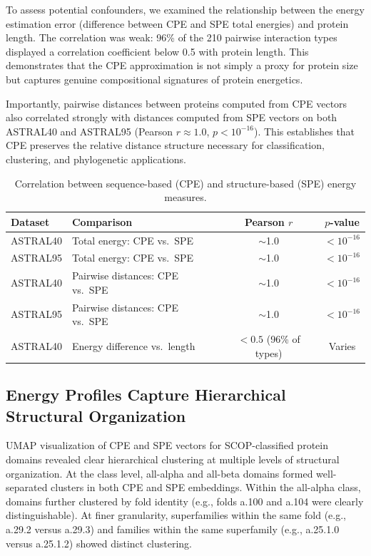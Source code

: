 \documentclass[11pt]{article}
\begin{document}
To assess potential confounders, we examined the relationship between the energy estimation error (difference between CPE and SPE total energies) and protein length. The correlation was weak: 96\% of the 210 pairwise interaction types displayed a correlation coefficient below 0.5 with protein length. This demonstrates that the CPE approximation is not simply a proxy for protein size but captures genuine compositional signatures of protein energetics.

Importantly, pairwise distances between proteins computed from CPE vectors also correlated strongly with distances computed from SPE vectors on both ASTRAL40 and ASTRAL95 (Pearson $r \approx 1.0$, $p < 10^{-16}$). This establishes that CPE preserves the relative distance structure necessary for classification, clustering, and phylogenetic applications.

\begin{table}[htbp]
\centering
\caption{Correlation between sequence-based (CPE) and structure-based (SPE) energy measures.}
\label{tab:correlations}
\begin{tabular}{llcc}
\toprule
\textbf{Dataset} & \textbf{Comparison} & \textbf{Pearson $r$} & \textbf{$p$-value} \\
\midrule
ASTRAL40 & Total energy: CPE vs.\ SPE & $\sim$1.0 & $<10^{-16}$ \\
ASTRAL95 & Total energy: CPE vs.\ SPE & $\sim$1.0 & $<10^{-16}$ \\
ASTRAL40 & Pairwise distances: CPE vs.\ SPE & $\sim$1.0 & $<10^{-16}$ \\
ASTRAL95 & Pairwise distances: CPE vs.\ SPE & $\sim$1.0 & $<10^{-16}$ \\
ASTRAL40 & Energy difference vs.\ length & $<0.5$ (96\% of types) & Varies \\
\bottomrule
\end{tabular}
\end{table}

\subsection{Energy Profiles Capture Hierarchical Structural Organization}

UMAP visualization of CPE and SPE vectors for SCOP-classified protein domains revealed clear hierarchical clustering at multiple levels of structural organization. At the class level, all-alpha and all-beta domains formed well-separated clusters in both CPE and SPE embeddings. Within the all-alpha class, domains further clustered by fold identity (e.g., folds a.100 and a.104 were clearly distinguishable). At finer granularity, superfamilies within the same fold (e.g., a.29.2 versus a.29.3) and families within the same superfamily (e.g., a.25.1.0 versus a.25.1.2) showed distinct clustering.
\end{document}

